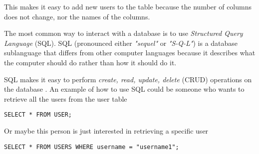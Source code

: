 This makes it easy to add new users to the table because the number of columns does not change, nor the names of the columns.

The most common way to interact with a database is to use \textit{Structured Query Language} (SQL). SQL (pronounced either \textit{"sequel"} or \textit{"S-Q-L"}) is a database sublanguage that differs from other computer languages because it describes what the computer should do rather than how it should do it. \cite{SQLIntroduction}

SQL makes it easy to perform \textit{create, read, update, delete} (CRUD) operations on the database \cite{OracleWhatIsDatabase}.
 An example of how to use SQL could be someone who wants to retrieve all the users from the user table

\begin{lstlisting}
SELECT * FROM USER;
\end{lstlisting}

Or maybe this person is just interested in retrieving a specific user

\begin{lstlisting}
SELECT * FROM USERS WHERE username = "username1";
\end{lstlisting}



